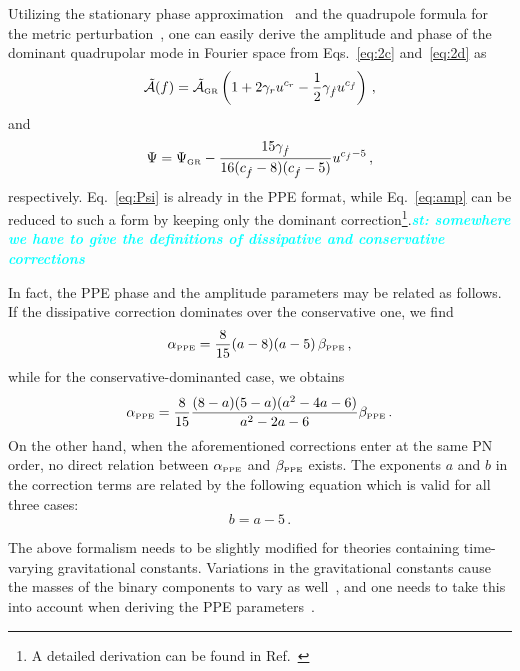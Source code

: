 \documentclass[prd,twocolumn,nofootinbib]{revtex4-1}
\newcommand\be{\begin{equation}}
\newcommand\ee{\end{equation}}
\newcommand{\PPE}{{\mbox{\tiny PPE}}}
\newcommand{\GR}{{\mbox{\tiny GR}}}
\newcommand{\st}[1]{\textcolor{cyan}{\it{\textbf{st: #1}}} }
\begin{document}
Utilizing the stationary phase approximation~\cite{PhysRevD.62.084036,Yunes:2009yz} and the quadrupole formula for the metric perturbation~\cite{Blanchet:2002av}, one can easily derive the amplitude and phase of the dominant quadrupolar mode in Fourier space from Eqs.~\eqref{eq:2c} and~\eqref{eq:2d} as
\begin{equation}\label{eq:amp}
\tilde{\mathcal{A}}(f)=\tilde{\mathcal{A}}_{\GR} \left(1+2\gamma_ru^{c_r}-\frac{1}{2}\gamma_{\dot{f}}u^{c_{\dot{f}}}\right)\,,
\end{equation}
and
\be
\label{eq:Psi}
\Psi = \Psi_\GR  -\frac{15 \text{$\gamma_{\dot{f}} $}}{16 (\text{$c_{\dot{f}}$}-8) (\text{$c_{\dot{f}}$}-5)} u^{c_{\dot{f}}-5}\,,
\ee
respectively. Eq.~\eqref{eq:Psi} is already in the PPE format, while  Eq.~\eqref{eq:amp} can be reduced to such a form by keeping only the dominant correction\footnote{A detailed derivation can be found in Ref.~\cite{Tahura:2018zuq}}.\st{somewhere we have to give the definitions of dissipative and conservative corrections}


In fact, the PPE phase and the amplitude parameters may be related as follows. If the dissipative correction dominates over the conservative one, we find
\begin{equation}\label{eq:2w2}
\alpha_{\PPE} = \frac{8}{15} (a-8)(a-5) \, \beta_{\PPE}\,,
\end{equation}
while for the conservative-dominanted case, we obtains
\begin{equation}\label{eq:2w3}
\alpha_{\PPE} =\frac{8}{15} \frac{(8-a)(5-a)(a^2-4a-6)}{a^2-2a-6} \beta_{\PPE}\,.
\end{equation}
On the other hand, when the aforementioned corrections enter at the same PN order, no direct relation between $\alpha_{\PPE}$ and $\beta_{\PPE}$ exists. The exponents $a$ and $b$ in the correction terms are related by the following equation which is valid for all three cases:
\begin{equation}
b=a-5\,.
\end{equation}


The above formalism needs to be slightly modified for theories containing time-varying gravitational constants. Variations in the gravitational constants cause the masses  of the binary components to vary as well~\cite{PhysRevLett.65.953}, and one needs to take this into account when deriving the PPE parameters~\cite{Tahura:2018zuq}.
\end{document}
